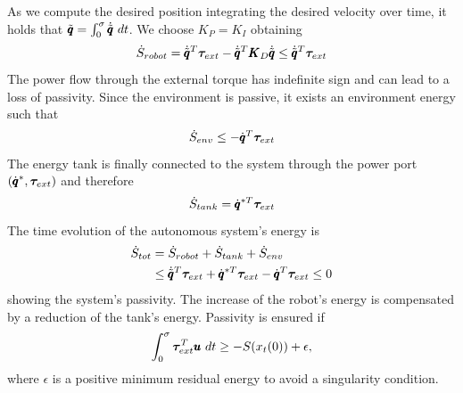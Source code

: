 As we compute the desired position integrating the desired velocity over time, it holds that $\tilde{\pmb{q}} = \int^{\sigma}_{0}
\dot{\tilde{\pmb{q}}}\ dt$. We choose $K_P = K_I$ obtaining
\begin{equation}
    \dot{S}_{robot} = \dot{\tilde{\pmb{q}}}^T \boldsymbol{\tau}_{ext} - \dot{\tilde{\pmb{q}}}^T \pmb{K}_D \dot{\tilde{\pmb{q}}} \leq \dot{\tilde{\pmb{q}}}^T \boldsymbol{\tau}_{ext} 
\end{equation}
The power flow through the external torque has indefinite sign and can lead to a loss of passivity. Since the environment is passive, it exists an environment energy such that ~\cite{shahriari2018valve}
\begin{equation}
    \dot{S}_{env} \leq -\dot{\pmb{q}}^T \boldsymbol{\tau}_{ext}
\end{equation}
The energy tank is finally connected to the system through the power port $(\dot{\pmb{q}}^*, \boldsymbol{\tau}_{ext})$ and therefore
\begin{equation} \label{eq:tank_dynamics}
\dot{S}_{tank} = \dot{\pmb{q}}^{*T} \boldsymbol{\tau}_{ext} 
\end{equation}
The time evolution of the autonomous system's energy is
\begin{equation}
\begin{aligned}
    \dot{S}_{tot} &= \dot{S}_{robot} + \dot{S}_{tank} + \dot{S}_{env} \\
    &\leq \dot{\tilde{\pmb{q}}}^T \boldsymbol{\tau}_{ext} + \dot{\pmb{q}}^{*T} \boldsymbol{\tau}_{ext} - \dot{\pmb{q}}^T \boldsymbol{\tau}_{ext} \leq 0
\end{aligned}
\end{equation}
showing the system's passivity. The increase of the robot's energy is compensated by a reduction of the tank's energy. Passivity is ensured if
\begin{equation}
    \int_{0}^{\sigma} \boldsymbol{\tau}_{ext}^T \pmb{u} \ dt \geq -S(x_t(0)) + \epsilon,
\end{equation}
where $\epsilon$ is a positive minimum residual energy to avoid a singularity condition.  

